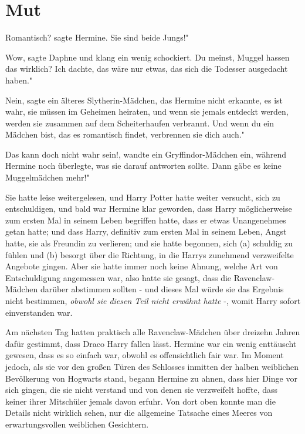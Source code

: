 \chapter{Mut}

\glqq Romantisch?\grqq{} sagte Hermine. \glqq Sie sind beide Jungs!"

\glqq Wow\grqq{}, sagte Daphne und klang ein wenig schockiert. \glqq Du meinst,
Muggel hassen das wirklich? Ich dachte, das wäre nur etwas, das sich die
Todesser ausgedacht haben."

\glqq Nein\grqq{}, sagte ein älteres Slytherin-Mädchen, das Hermine nicht
erkannte, \glqq es ist wahr, sie müssen im Geheimen heiraten, und wenn sie
jemals entdeckt werden, werden sie zusammen auf dem Scheiterhaufen verbrannt.
Und wenn du ein Mädchen bist, das es romantisch findet, verbrennen sie dich
auch."

\glqq Das kann doch nicht wahr sein!\grqq{}, wandte ein Gryffindor-Mädchen ein,
während Hermine noch überlegte, was sie darauf antworten sollte. \glqq Dann gäbe
es keine Muggelmädchen mehr!"

Sie hatte leise weitergelesen, und Harry Potter hatte weiter versucht, sich zu
entschuldigen, und bald war Hermine klar geworden, dass Harry möglicherweise zum
ersten Mal in seinem Leben begriffen hatte, dass er etwas Unangenehmes getan
hatte; und dass Harry, definitiv zum ersten Mal in seinem Leben, Angst hatte,
sie als Freundin zu verlieren; und sie hatte begonnen, sich (a) schuldig zu
fühlen und (b) besorgt über die Richtung, in die Harrys zunehmend verzweifelte
Angebote gingen. Aber sie hatte immer noch keine Ahnung, welche Art von
Entschuldigung angemessen war, also hatte sie gesagt, dass die Ravenclaw-Mädchen
darüber abstimmen sollten - und dieses Mal würde sie das Ergebnis nicht
bestimmen, \emph{obwohl sie diesen Teil nicht erwähnt hatte} -, womit Harry
sofort einverstanden war.

Am nächsten Tag hatten praktisch alle Ravenclaw-Mädchen über dreizehn Jahren
dafür gestimmt, dass Draco Harry fallen lässt. Hermine war ein wenig enttäuscht
gewesen, dass es so einfach war, obwohl es offensichtlich fair war. Im Moment
jedoch, als sie vor den großen Türen des Schlosses inmitten der halben
weiblichen Bevölkerung von Hogwarts stand, begann Hermine zu ahnen, dass hier
Dinge vor sich gingen, die sie nicht verstand und von denen sie verzweifelt
hoffte, dass keiner ihrer Mitschüler jemals davon erfuhr. Von dort oben konnte
man die Details nicht wirklich sehen, nur die allgemeine Tatsache eines Meeres
von erwartungsvollen weiblichen Gesichtern.

